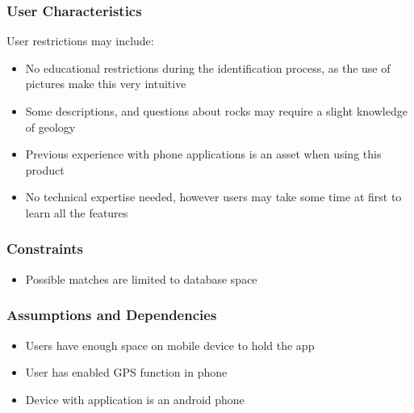 \documentclass[titlepage]{article}
\begin{document}
\subsubsection{User Characteristics}

User restrictions may include:\\
\begin{itemize}

\item No educational restrictions during the identification process, as the use of pictures make this very intuitive\\
\item Some descriptions, and questions about rocks may require a slight knowledge of geology \\
\item Previous experience with phone applications is an asset when using this product\\
\item No technical expertise needed, however users may take some time at first to learn all the features\\

\end{itemize}


\subsubsection{Constraints}

\begin{itemize}
\item Possible matches are limited to database space\\
\end{itemize}


\subsubsection{Assumptions and Dependencies}

\begin{itemize}
\item Users have enough space on mobile device to hold the app\\
\item User has enabled GPS function in phone\\
\item Device with application is an android phone\\
\end{itemize}
\end{document}

